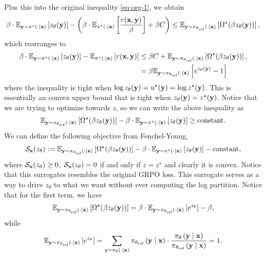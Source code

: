 \documentclass[11pt]{article}  %
\begin{document}
Plus this into the original inequality \eqref{eq:org-1}, we obtain 
\begin{align*}
  \beta \cdot \mathbb{E}_{\mathbf{y} \sim \pi^\star(\cdot \mid \mathbf{x})}\left[z_{\theta}(\mathbf{y})\right] - \left( \beta\cdot \mathbb{E}_{\pi^\star(\cdot\mid \mathbf{x})}\left[\frac{r(\mathbf{x}, \mathbf{y})}{\beta}\right] + \beta C \right) \leq \mathbb{E}_{\mathbf{y} \sim \pi_{\theta_{\text{ref}}}\left( \cdot \mid \mathbf{x} \right)}\left[\Omega^\star(\beta z_{\theta}(\mathbf{y}))\right],
\end{align*} 
which rearranges to 
\begin{align*}
  \beta \cdot \mathbb{E}_{\mathbf{y} \sim \pi^\star(\cdot \mid \mathbf{x})}\left[z_{\theta}(\mathbf{y})\right] - \mathbb{E}_{\pi^\star(\cdot\mid \mathbf{x})}\left[{r(\mathbf{x}, \mathbf{y})}\right] &\leq \beta C + \mathbb{E}_{\mathbf{y} \sim \pi_{\theta_{\text{ref}}}\left( \cdot \mid \mathbf{x} \right)}\left[\Omega^\star(\beta z_{\theta}(\mathbf{y}))\right], \\
  &= \beta\mathbb{E}_{\mathbf{y} \sim \pi_{\theta_{\text{ref}}}\left( \cdot \mid \mathbf{x} \right)}\left[e^{z_{\theta}(\mathbf{y})} - 1\right]
\end{align*}
where the inequality is tight when $\log z_{\theta}(\mathbf{y}) = u^\star(\mathbf{y}) = \log z^\star(\mathbf{y})$. 
This is essentially an convex upper bound that is tight when $z_{\theta}(\mathbf{y}) = z^\star(\mathbf{y})$.
Notice that we are trying to optimize towards $z$, so we can write the above inequality as 
\begin{align*}
  \mathbb{E}_{\mathbf{y} \sim \pi_{\theta_{\text{ref}}}\left( \cdot \mid \mathbf{x} \right)}\left[\Omega^\star(\beta z_{\theta}(\mathbf{y}))\right] - \beta \cdot \mathbb{E}_{\mathbf{y} \sim \pi^\star(\cdot \mid \mathbf{x})}\left[z_{\theta}(\mathbf{y})\right] \geq \text{constant}.
\end{align*}
We can define the following objective from Fenchel-Young,
\begin{align*}
  \mathcal{S}_{\mathbf{x}}(z_\theta) := \mathbb{E}_{\mathbf{y} \sim \pi_{\theta_{\text{ref}}}\left( \cdot \mid \mathbf{x} \right)}\left[\Omega^\star(\beta z_{\theta}(\mathbf{y}))\right] - \beta \cdot \mathbb{E}_{\mathbf{y} \sim \pi^\star(\cdot \mid \mathbf{x})}\left[z_{\theta}(\mathbf{y})\right] - \text{constant},
\end{align*}
where $\mathcal{S}_{\mathbf{x}}(z_\theta) \geq 0$, $\mathcal{S}_{\mathbf{x}}(z_\theta) = 0$ if and only if $z = z^\star$ and clearly it is convex.
Notice that this surrogates resembles the original GRPO loss.
This surrogate serves as a way to drive $z_\theta$ to what we want without ever computing the log partition.
Notice that for the first term, we have 
\begin{align*}
  \mathbb{E}_{\mathbf{y} \sim \pi_{\theta_{\text{ref}}}\left( \cdot \mid \mathbf{x} \right)}\left[\Omega^\star(\beta z_{\theta}(\mathbf{y}))\right] = \beta \cdot \mathbb{E}_{\mathbf{y} \sim \pi_{\theta_{\text{ref}}}\left( \cdot \mid \mathbf{x} \right)}\left[e^{z_\theta}\right] - \beta,
\end{align*}
while 
\begin{align*}
  \mathbb{E}_{\mathbf{y} \sim \pi_{\theta_{\text{ref}}}\left( \cdot \mid \mathbf{x} \right)}\left[e^{z_\theta}\right] = \sum_{y \sim \pi_{\theta}\left( \cdot \mid \mathbf{x} \right)}\pi_{\theta_{\text{ref}}}\left( \mathbf{y} \mid \mathbf{x} \right)\cdot\frac{\pi_{\theta}\left( \mathbf{y} \mid \mathbf{x} \right)}{\pi_{\theta_{\text{ref}}}\left( \mathbf{y} \mid \mathbf{x} \right)} = 1.
\end{align*}
\end{document}
